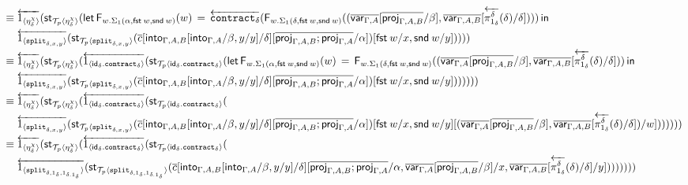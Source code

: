 \documentclass[10pt]{article}
\theoremstyle{definition}
\newcommand\dsd[1]{\ensuremath{\mathsf{#1}}}
\newcommand{\app}[2]{\ensuremath{#1 \: #2}}
\newcommand{\fst}[1]{\app{\dsd{fst}}{#1}}
\newcommand{\snd}[1]{\app{\dsd{snd}}{#1}}
\newcommand{\id}{\mathsf{id}}
\newcommand{\rewrite}[2]{\overleftarrow{#1}(#2)}
\newcommand\StI[2]{\ensuremath{\mathsf{st}_{#1}(#2)}}
\newcommand\FEs[4]{\ensuremath{\mathsf{let} \, \mathsf{F}_{#1}(#3) \, = \, {#2} \, \mathsf{in} \, #4}}
\newcommand\FIs[2]{\ensuremath{\mathsf{F}_{#1}{(#2)}}}
\newcommand\ApEl[2]{\mathcal{T}_{#1}\langle#2\rangle}
\newcommand\bdot[0]{\mathbin{.}}
\begin{document}
\begin{enumerate}[style = multiline, labelwidth = 80pt]
\begin{align*}
\equiv{} &\rewrite{1_{\langle \eta^\chi_\delta \rangle}}{\StI{\ApEl{p}{\eta^\chi_\delta}}{\FEs{w. \Sigma_1(\alpha,\fst w, \snd w)}{\rewrite{\contract{\delta}}{\FIs{w. \Sigma_1(\delta,\fst w, \snd w)}{(\upstairs{\qvar{\Gamma, A}}[\upstairs{\proj{\Gamma, A, B}}/\beta], \upstairs{\qvar{\Gamma, A, B}}[\rewrite{\pi^\delta_{1_\delta}}{\delta}/\delta])}}}{w}{\\&\rewrite{\ApOne{\tsplit{\delta,x,y}}}{\StI{\ApEl{p}{\tsplit{\delta,x,y}}}{\upstairs{c}[\into{\Gamma, A, B}[\into{\Gamma, A}/\beta, y/y] /\delta][\upstairs{\proj{\Gamma, A, B};\proj{\Gamma, A}}/\alpha]}[\fst w/x, \snd w/y]}})}} \\
\equiv{} &\rewrite{1_{\langle \eta^\chi_\delta \rangle}}{\StI{\ApEl{p}{\eta^\chi_\delta}}{\rewrite{1_{\langle \id_\delta \bdot \contract{\delta} \rangle}}{\StI{\ApEl{p}{\id_\delta \bdot \contract{\delta}}}{\FEs{w. \Sigma_1(\alpha,\fst w, \snd w)}{\FIs{w. \Sigma_1(\delta,\fst w, \snd w)}{(\upstairs{\qvar{\Gamma, A}}[\upstairs{\proj{\Gamma, A, B}}/\beta], \upstairs{\qvar{\Gamma, A, B}}[\rewrite{\pi^\delta_{1_\delta}}{\delta}/\delta])}}{w}{\\&\rewrite{\ApOne{\tsplit{\delta,x,y}}}{\StI{\ApEl{p}{\tsplit{\delta,x,y}}}{\upstairs{c}[\into{\Gamma, A, B}[\into{\Gamma, A}/\beta, y/y] /\delta][\upstairs{\proj{\Gamma, A, B};\proj{\Gamma, A}}/\alpha]}[\fst w/x, \snd w/y]}})}}}} \\
\equiv{} &\rewrite{1_{\langle \eta^\chi_\delta \rangle}}{\StI{\ApEl{p}{\eta^\chi_\delta}}{\rewrite{1_{\langle \id_\delta \bdot \contract{\delta} \rangle}}{\StI{\ApEl{p}{\id_\delta \bdot \contract{\delta}}}{\\&\rewrite{\ApOne{\tsplit{\delta,x,y}}}{\StI{\ApEl{p}{\tsplit{\delta,x,y}}}{\upstairs{c}[\into{\Gamma, A, B}[\into{\Gamma, A}/\beta, y/y] /\delta][\upstairs{\proj{\Gamma, A, B};\proj{\Gamma, A}}/\alpha]}[\fst w/x, \snd w/y][(\upstairs{\qvar{\Gamma, A}}[\upstairs{\proj{\Gamma, A, B}}/\beta], \upstairs{\qvar{\Gamma, A, B}}[\rewrite{\pi^\delta_{1_\delta}}{\delta}/\delta])/w]}})}}} \\
\equiv{} &\rewrite{1_{\langle \eta^\chi_\delta \rangle}}{\StI{\ApEl{p}{\eta^\chi_\delta}}{\rewrite{1_{\langle \id_\delta \bdot \contract{\delta} \rangle}}{\StI{\ApEl{p}{\id_\delta \bdot \contract{\delta}}}{\\&\rewrite{\ApOne{\tsplit{\delta,1_\delta,1_{\delta.1_\delta}}}}{\StI{\ApEl{p}{\tsplit{\delta,1_\delta,1_{\delta.1_\delta}}}}{\upstairs{c}[\into{\Gamma, A, B}[\into{\Gamma, A}/\beta, y/y] /\delta][\upstairs{\proj{\Gamma, A, B};\proj{\Gamma, A}}/\alpha, \upstairs{\qvar{\Gamma, A}}[\upstairs{\proj{\Gamma, A, B}}/\beta]/x, \upstairs{\qvar{\Gamma, A, B}}[\rewrite{\pi^\delta_{1_\delta}}{\delta}/\delta]/y]}}})}}} \\

\end{align*}
\end{enumerate}
\end{document}
